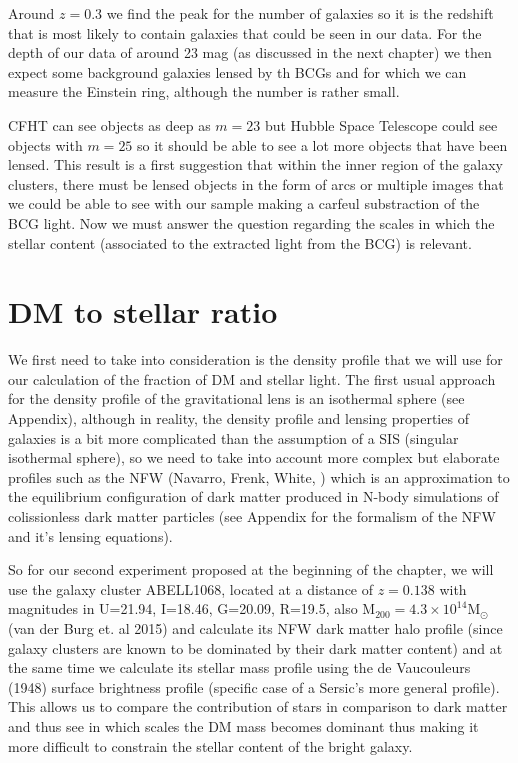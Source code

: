 Around $z=0.3$ we find the peak for the number of galaxies so it is the redshift that is most likely to contain galaxies that could be seen in our data. For the depth of our data of around 23 mag (as discussed in the next chapter) we then expect some background galaxies lensed by th BCGs and for which we can measure the Einstein ring, although the number is rather small. 

CFHT can see objects as deep as $m=23$ but Hubble Space Telescope could see objects with $m=25$ so it should be able to see a lot more objects that have been lensed. This result is a first suggestion that within the inner region of the galaxy clusters, there must be lensed objects in the form of arcs or multiple images that we could be able to see with our sample making a carfeul substraction of the BCG light. Now we must answer the question regarding the scales in which the stellar content (associated to the extracted light from the BCG) is relevant.

\section{DM to stellar ratio}

We first need to take into consideration is the density profile that we will use for our calculation of the fraction of DM and stellar light. The first usual approach for the density profile of the gravitational lens is an isothermal sphere (see Appendix), although in reality, the density profile and lensing properties of galaxies is a bit more complicated than the assumption of a SIS (singular isothermal sphere), so we need to take into account more complex but elaborate profiles such as the NFW (Navarro, Frenk, White, \citeyear{Reference17}) which is an approximation to the equilibrium configuration of dark matter produced in N-body simulations of colissionless dark matter particles (see Appendix for the formalism of the NFW and it's lensing equations).

So for our second experiment proposed at the beginning of the chapter, we will use the galaxy cluster ABELL1068, located at a distance of $z=0.138$ with magnitudes in U=21.94, I=18.46, G=20.09, R=19.5, also $\text{M}_{200}=4.3\times 10^{14}\text{M}_{\odot}$ (van der Burg et. al 2015) and calculate its NFW dark matter halo profile (since galaxy clusters are known to be dominated by their dark matter content) and at the same time we calculate its stellar mass profile using the de Vaucouleurs (1948) surface brightness profile (specific case of a Sersic's more general profile). This allows us to compare the contribution of stars in comparison to dark matter and thus see in which scales the DM mass becomes dominant thus making it more difficult to constrain the stellar content of the bright galaxy.

